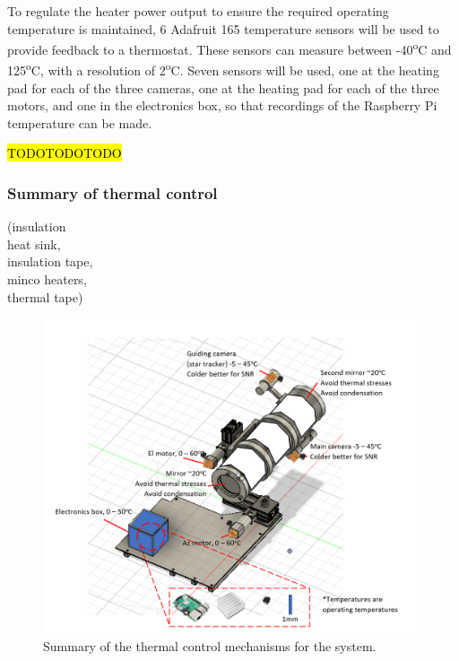 To regulate the heater power output to ensure the required operating temperature is maintained, 6 Adafruit 165 temperature sensors will be used to provide feedback to a thermostat. These sensors can measure between -40\textsuperscript{o}C and 125\textsuperscript{o}C, with a resolution of 2\textsuperscript{o}C. Seven sensors will be used, one at the heating pad for each of the three cameras, one at the heating pad for each of the three motors, and one in the electronics box, so that recordings of the Raspberry Pi temperature can be made. 

\hl{TODOTODOTODO}













\subsubsection{Summary of thermal control}
(insulation \\
heat sink,\\ 
insulation tape,\\
minco heaters,\\
thermal tape)\\



\begin{figure}[h!]
\centering
\includegraphics[scale=0.8]{4-experiment-design/img/mechanical/thermalsolutions.png}
\caption{Summary of the thermal control mechanisms for the system.}
\label{fig:thermalsolutions}
\end{figure}